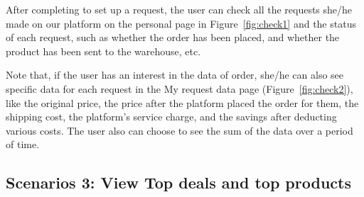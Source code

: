 After completing to set up a request, the user can check all the requests she/he made on our platform on the personal page in Figure~\ref{fig:check1} and the status of each request, such as whether the order has been placed, and whether the product has been sent to the warehouse, etc.

Note that, if the user has an interest in the data of order, she/he can also see specific data for each request in the My request data page (Figure~\ref{fig:check2}), like the original price, the price after the platform placed the order for them, the shipping cost, the platform's service charge, and the savings after deducting various costs. The user also can choose to see the sum of the data over a period of time.

\subsection{Scenarios 3: View Top deals and top products}

